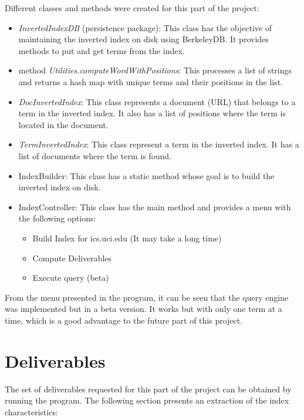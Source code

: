 \documentclass[paper=a4, fontsize=11pt]{scrartcl} %
\numberwithin{equation}{section} %
\numberwithin{table}{section} %
\begin{document}
Different classes and methods were created for this part of the project:
\begin{itemize}
\item \textit{InvertedIndexDB} (persistence package): This class has the objective of maintaining the inverted index on disk using BerkeleyDB. It provides methods to put and get terms from the index.
\item method \textit{Utilities.computeWordWithPositions}: This processes a list of strings and returns a hash map with unique terms and their positions in the list.
\item \textit{DocInvertedIndex}: This class represents a document (URL) that belongs to a term in the inverted index. It also has a list of positions where the term is located in the document.
\item \textit{TermInvertedIndex}: This class represent a term  in the inverted index. It has a list of documents where the term is found.
\item IndexBuilder: This class has a static method whose goal is to build the inverted index on disk.
\item IndexController: This class has the main method and provides a menu with the following options:
\begin{itemize}
\item Build Index for ics.uci.edu (It may take a long time)
\item Compute Deliverables
\item Execute query (beta)
\end{itemize}
\end{itemize}

From the menu presented in the program, it can be seen that the query engine was implemented but in a beta version. It works but with only one term at a time, which is a good advantage to the future part of this project.

\section*{Deliverables}
The set of deliverables requested for this part of the project can be obtained by running the program. The following section presents an extraction of the index characteristics:
\end{document}
